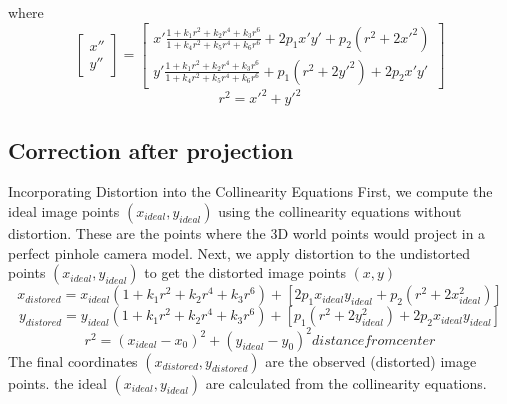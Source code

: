 where
\[
\begin{bmatrix}
    x'' \\ y''
\end{bmatrix} =
\begin{bmatrix}
    x'\frac{1+k_1r^2+k_2r^4+k_3r^6}{1+k_4r^2+k_5r^4+k_6r^6} + 2p_1x'y' + p_2(r^2+2x'^2) \\
    y'\frac{1+k_1r^2+k_2r^4+k_3r^6}{1+k_4r^2+k_5r^4+k_6r^6} + p_1(r^2+2y'^2) + 2p_2x'y'
\end{bmatrix}
\]
\[
r^2 = x'^2 + y'^2
\]


\subsection{Correction after projection}

Incorporating Distortion into the Collinearity Equations
First, we compute the ideal image points $(x_{ideal},y_{ideal})$ using the collinearity equations without distortion. These are the points where the 3D world points would project in a perfect pinhole camera model. Next, we apply distortion to the undistorted points $(x_{ideal},y_{ideal})$ to get the distorted image points $(x,y)$
\[
x_{distored} = x_{ideal} (1+k_1r^2+k_2r^4+k_3r^6) + [2p_1x_{ideal}y_{ideal} + p_2(r^2+2x_{ideal}^2)]
\]
\[
y_{distored} = y_{ideal} (1+k_1r^2+k_2r^4+k_3r^6) + [p_1(r^2+2y_{ideal}^2) + 2p_2x_{ideal}y_{ideal}]
\]
\[
r^2 = (x_{ideal} - x_0)^2 + (y_{ideal} - y_0)^2 distance from center
\]
The final coordinates $(x_{distored},y_{distored})$ are the observed (distorted) image points. the ideal $(x_{ideal},y_{ideal})$ are calculated from the collinearity equations.



